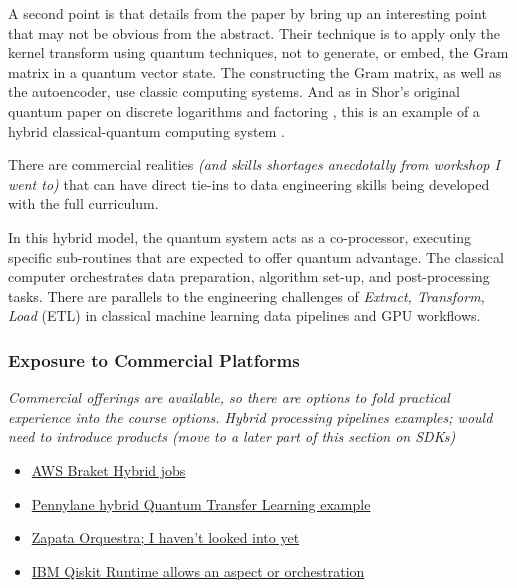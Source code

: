 A second point is that details from the paper by \citeauthor{Kyriienko:2022} 
bring up an interesting point that may not be obvious from the abstract. 
Their technique is to apply only the kernel transform using quantum techniques, 
not to generate, or embed, the Gram matrix in a quantum vector state.
The constructing the Gram matrix, as well as the autoencoder, use classic computing systems. 
And as in Shor's original quantum paper on discrete logarithms and factoring \cite{Shor:1996},
this is an example of a hybrid classical-quantum computing system \cite{Preskill:2023}.

There are commercial realities \emph{(and skills shortages anecdotally from workshop I went to)}
that can have direct tie-ins to data engineering skills being developed with the full curriculum.

In this hybrid model, 
the quantum system acts as a co-processor, executing specific sub-routines that are expected to offer quantum advantage.
The classical computer orchestrates data preparation, algorithm set-up, and post-processing tasks.
There are parallels to the engineering challenges of \emph{Extract, Transform, Load} (ETL) 
in classical machine learning data pipelines and GPU workflows.

\subsubsection{Exposure to Commercial Platforms}

\emph{Commercial offerings are available, so there are options to fold practical experience into the course options.
	Hybrid processing pipelines examples; would need to introduce products (move to a later part of this section on SDKs)}

\begin{itemize}
	\item \href{https://docs.aws.amazon.com/braket/latest/developerguide/braket-what-is-hybrid-job.html}
	{AWS Braket Hybrid jobs}
	\item \href{https://pennylane.ai/qml/demos/tutorial_quantum_transfer_learning}
	{Pennylane hybrid Quantum Transfer Learning example}
	\item \href{https://ml2quantum.com/2020/05/22/zapata-orquestra/}
	{Zapata Orquestra; I haven't looked into yet}
	\item \href{https://docs.quantum.ibm.com/api/qiskit-ibm-runtime/0.16/runtime-service
	}{IBM Qiskit Runtime allows an aspect or orchestration}
\end{itemize}

